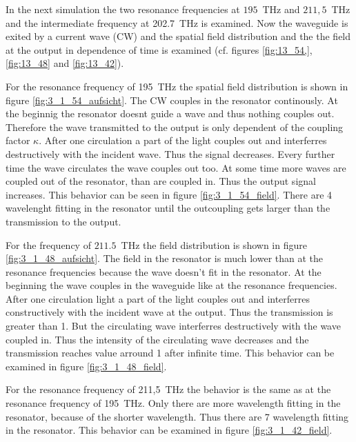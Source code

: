 In the next simulation the two resonance frequencies at $195$~THz and $211,5$~THz and the intermediate frequency at 202.7~THz is examined. Now the waveguide is exited by a current wave (CW) and the spatial field distribution and the the field at the output in dependence of time is examined (cf. figures \ref{fig:13_54,},\ref{fig:13_48} and \ref{fig:13_42}).

For the resonance frequency of 195~THz the spatial field distribution is shown in figure \ref{fig:3_1_54_aufsicht}. The CW couples in the resonator continously. At the beginnig the resonator doesnt guide a wave and thus nothing couples out. Therefore the wave transmitted to the output is only dependent of the coupling factor $\kappa$. After one circulation a part of the light couples out and interferres destructively with the incident wave. Thus the signal decreases. Every further time the wave circulates the wave couples out too. At some time more waves are coupled out of the resonator, than are coupled in. Thus the output signal increases. This behavior can be seen in figure \ref{fig:3_1_54_field}. There are 4 wavelenght fitting in the resonator until the outcoupling gets larger than the transmission to the output. 

For the frequency of $211.5$~THz the field distribution is shown in figure \ref{fig:3_1_48_aufsicht}. The field in the resonator is much lower than at the resonance frequencies because the wave doesn't fit in the resonator. At the beginning the wave couples in the waveguide like at the resonance frequencies. After one circulation light a part of the light couples out and interferres constructively with the incident wave at the output. Thus the transmission is greater than 1. But the circulating wave interferres destructively with the wave coupled in. Thus the intensity of the circulating wave decreases and the transmission reaches value arround 1 after infinite time. This behavior can be examined in figure \ref{fig:3_1_48_field}.

For the resonance frequency of 211,5~THz the behavior is the same as at the resonance frequency of 195~THz. Only there are more wavelength fitting in the resonator, because of the shorter wavelength. Thus there are 7 wavelength fitting in the resonator. This behavior can be examined in figure \ref{fig:3_1_42_field}. 


